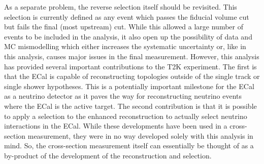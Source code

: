\newline
\newline
As a separate problem, the reverse selection itself should be revisited.  This selection is currently defined as any event which passes the fiducial volume cut but fails the final (most upstream) cut.  While this allowed a large number of events to be included in the analysis, it also open up the possibility of data and MC mismodelling which either increases the systematic uncertainty or, like in this analysis, causes major issues in the final measurement.
\newline
\newline
However, this analysis has provided several important contributions to the T2K experiment.  The first is that the ECal is capable of reconstructing topologies outside of the single track or single shower hypotheses.  This is a potentially important milestone for the ECal as a neutrino detector as it paves the way for reconstructing neutrino events where the ECal is the active target.  The second contribution is that it is possible to apply a selection to the enhanced reconstruction to actually select neutrino interactions in the ECal.  While these developments have been used in a cross-section measurement, they were in no way developed solely with this analysis in mind.  So, the cross-section measurement itself can essentially be thought of as a by-product of the development of the reconstruction and selection.

